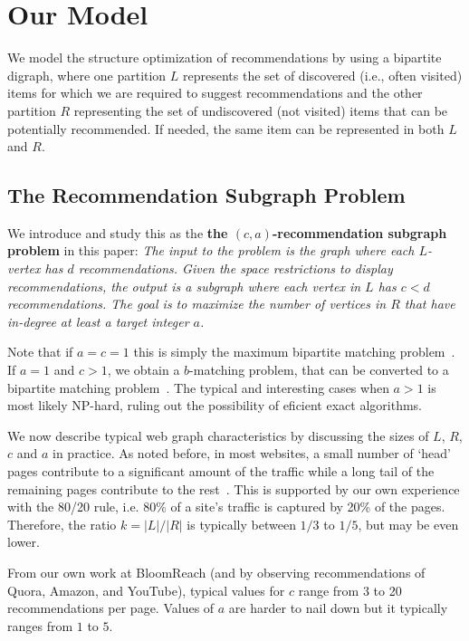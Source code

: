 \section{Our Model}
\label{modelsec}

We model the structure optimization of recommendations by using a bipartite
digraph, where one partition $L$ represents the set of discovered
(i.e., often visited) items for which we are required to suggest recommendations and the other partition $R$
representing the set of undiscovered (not visited) items that can be potentially recommended. If
needed, the same item can be represented in both $L$ and $R$.
\vs

\subsection{The Recommendation Subgraph Problem}
\label{recsub}
We introduce and study this as the {\bf the $(c, a)$-recommendation subgraph problem} in this paper:
{\em
 The input to the problem is the graph where each
$L$-vertex has $d$ recommendations. Given the space restrictions to
display recommendations, the output is a subgraph where each vertex in
$L$ has $c < d$ recommendations. The goal is to maximize the number of
vertices in $R$ that have in-degree at least a target integer $a$.
}

\vs

Note that if $a=c=1$ this is simply the maximum bipartite
matching problem~\cite{LovaszPlummer1986}. If $a=1$ and $c > 1$, we
obtain a $b$-matching problem, that can be converted to a bipartite
matching problem~\cite{Gabow1983}. The typical and interesting cases when $a > 1$ is most likely NP-hard, ruling out the possibility of eficient exact algorithms.\vs

We now describe typical web graph characteristics by discussing the
sizes of $L$, $R$, $c$ and $a$ in practice. As noted before, in most
websites, a small number of `head' pages contribute to a significant
amount of the traffic while a long tail of the remaining pages
contribute to the rest~\cite{HubermanAdamic1999,
  DuDemmerBrewer2006, KumarNorrisSun2009}. This is supported by our
own experience with the 80/20 rule, i.e. 80\% of a site's traffic is
captured by 20\% of the pages. Therefore, the ratio $k=|L|/|R|$ is
typically between $1/3$ to $1/5$, but may be even lower. \vs

From our own work at BloomReach (and by observing recommendations of Quora, Amazon, and YouTube), typical values for $c$ range from 3 to 20
recommendations per page. Values of $a$ are harder to nail down but it
typically ranges from $1$ to $5$.\vs

